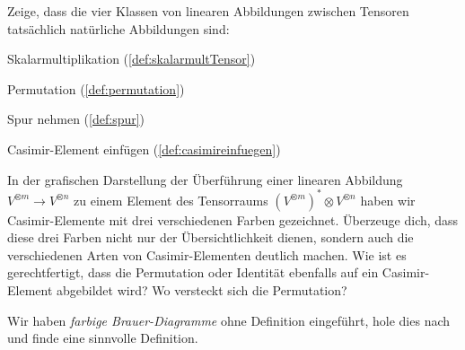 \begin{sheet}
\begin{problem}[title={Die 4 Klassen von linearen Tensor-Abbildungen sind natürlich}]
	\label{aufg:natAbbKlass}
	Zeige, dass die vier Klassen von linearen Abbildungen zwischen Tensoren tatsächlich natürliche Abbildungen sind:
	\begin{subproblem}
		Skalarmultiplikation (\ref{def:skalarmultTensor})
	\end{subproblem}
	\begin{subproblem}
		Permutation (\ref{def:permutation})
	\end{subproblem}
	\begin{subproblem}
		Spur nehmen (\ref{def:spur})
	\end{subproblem}
	\begin{subproblem}
		Casimir-Element einfügen (\ref{def:casimireinfuegen})
	\end{subproblem}
\end{problem}

\begin{problem}[title={Bunte Casimir-Elemente}]
	In der grafischen Darstellung der Überführung einer linearen Abbildung $V^{\otimes m} \to V^{\otimes n}$ zu einem Element des Tensorraums $\left(V^{\otimes m}\right)^\ast \otimes V^{\otimes n}$ haben wir Casimir-Elemente mit drei verschiedenen Farben gezeichnet. Überzeuge dich, dass diese drei Farben nicht nur der Übersichtlichkeit dienen, sondern auch die verschiedenen Arten von Casimir-Elementen deutlich machen. Wie ist es gerechtfertigt, dass die Permutation oder Identität ebenfalls auf ein Casimir-Element abgebildet wird? Wo versteckt sich die Permutation?
	
	Wir haben \emph{farbige Brauer-Diagramme} ohne Definition eingeführt, hole dies nach und finde eine sinnvolle Definition.
\end{problem}


\end{sheet}

